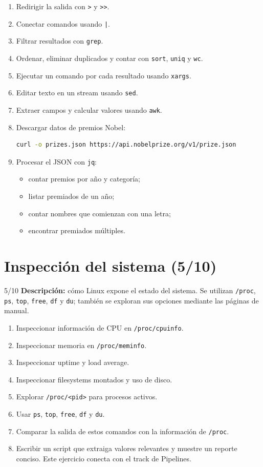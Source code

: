 \documentclass[11pt,a4paper]{article}
\begin{document}
\begin{enumerate}
  \item Redirigir la salida con \texttt{>} y \texttt{>>}.
  \item Conectar comandos usando \texttt{|}.
  \item Filtrar resultados con \texttt{grep}.
  \item Ordenar, eliminar duplicados y contar con \texttt{sort}, \texttt{uniq} y \texttt{wc}.
  \item Ejecutar un comando por cada resultado usando \texttt{xargs}.
  \item Editar texto en un stream usando \texttt{sed}.
  \item Extraer campos y calcular valores usando \texttt{awk}.
  \item Descargar datos de premios Nobel:
    \begin{lstlisting}[language=bash]
curl -o prizes.json https://api.nobelprize.org/v1/prize.json
    \end{lstlisting}
  \item Procesar el JSON con \texttt{jq}:
    \begin{itemize}
      \item contar premios por año y categoría;
      \item listar premiados de un año;
      \item contar nombres que comienzan con una letra;
      \item encontrar premiados múltiples.
    \end{itemize}
\end{enumerate}

\newpage
\section{Inspección del sistema (5/10)}

\begin{trackbox}{5/10}
\textbf{Descripción:} cómo Linux expone el estado del sistema. Se utilizan \texttt{/proc}, \texttt{ps}, \texttt{top}, \texttt{free}, \texttt{df} y \texttt{du}; también se exploran sus opciones mediante las páginas de manual.
\end{trackbox}

\begin{enumerate}
  \item Inspeccionar información de CPU en \texttt{/proc/cpuinfo}.
  \item Inspeccionar memoria en \texttt{/proc/meminfo}.
  \item Inspeccionar uptime y load average.
  \item Inspeccionar filesystems montados y uso de disco.
  \item Explorar \texttt{/proc/<pid>} para procesos activos.
  \item Usar \texttt{ps}, \texttt{top}, \texttt{free}, \texttt{df} y \texttt{du}.
  \item Comparar la salida de estos comandos con la información de \texttt{/proc}.
  \item Escribir un script que extraiga valores relevantes y muestre un reporte conciso. Este ejercicio conecta con el track de Pipelines.
\end{enumerate}
\end{document}
